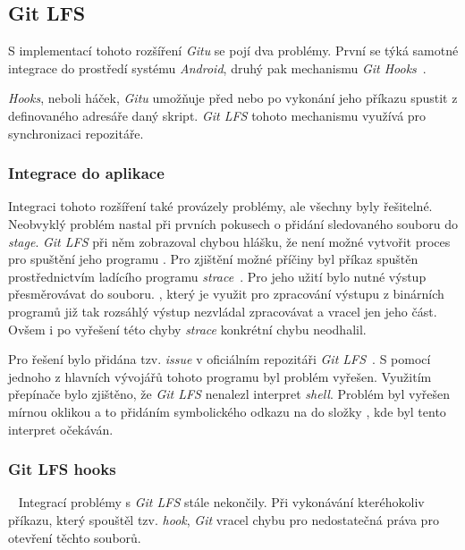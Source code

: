     \newpage
    \subsection{Git LFS}\label{sec:problemy_lfs}
    S implementací tohoto rozšíření \emph{Gitu} se pojí dva problémy. První se týká samotné integrace do prostředí systému \emph{Android}, druhý pak mechanismu \emph{Git Hooks}~.

    \emph{Hooks}, neboli háček, \emph{Gitu} umožňuje před nebo po vykonání jeho příkazu spustit z definovaného adresáře daný skript. \emph{Git LFS} tohoto mechanismu využívá pro synchronizaci repozitáře.

    \subsubsection{Integrace do aplikace}
    Integraci tohoto rozšíření také provázely problémy, ale všechny byly řešitelné. Neobvyklý problém nastal při prvních pokusech o přidání sledovaného souboru do \emph{stage}. \emph{Git LFS} při něm zobrazoval chybou hlášku, že není možné vytvořit proces pro spuštění jeho programu . Pro zjištění možné příčiny byl příkaz  spuštěn prostřednictvím ladícího programu \emph{strace}~. Pro jeho užití bylo nutné výstup přesměrovávat do souboru. , který je využit pro zpracování výstupu z binárních programů již tak rozsáhlý výstup nezvládal zpracovávat a vracel jen jeho část. Ovšem i po vyřešení této chyby \emph{strace} konkrétní chybu neodhalil.
    
    Pro řešení bylo přidána tzv. \emph{issue} v oficiálním repozitáři \emph{Git LFS}~. S pomocí jednoho z hlavních vývojářů tohoto programu byl problém vyřešen. Využitím přepínače  bylo zjištěno, že \emph{Git LFS} nenalezl interpret \emph{shell}. Problém byl vyřešen mírnou oklikou a to přidáním symbolického odkazu na  do složky , kde byl tento interpret očekáván.

    \subsubsection{Git LFS hooks}~\label{subsub:problemy_git_hooks}
    Integrací problémy s \emph{Git LFS} stále nekončily. Při vykonávání kteréhokoliv příkazu, který spouštěl tzv. \emph{hook}, \emph{Git} vracel chybu pro nedostatečná práva pro otevření těchto souborů.
    
